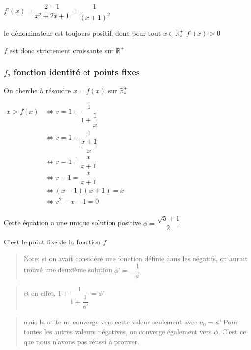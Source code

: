 \documentclass[]{scrartcl}
\begin{document}
\(f’(x) = \dfrac{2-1}{x^2 + 2x + 1} = \dfrac{1}{(x+1)^2}\)

le dénominateur est toujours positif, donc pour tout
\(x \in \mathbb{R}^+_*\) \(f’(x) > 0\)

\(f\) est donc strictement croissante sur \(\mathbb{R}^+\)

\vspace*{2cm}{}

\hypertarget{f-fonction-identituxe9-et-points-fixes}{%
\subsubsection{\texorpdfstring{\(f\), fonction identité et points
fixes}{f, fonction identité et points fixes}}\label{f-fonction-identituxe9-et-points-fixes}}

On cherche à résoudre \(x = f(x)\) sur \(\mathbb{R}^+_*\)

\(\begin{array}{cl} x > f (x) &\iff x = 1 + \dfrac{1}{1 + \dfrac{1}{x}}\\[6ex] &\iff x = 1 + \dfrac{1}{\dfrac{x + 1}{x}}\\[6ex] &\iff x = 1 + \dfrac{x}{x+1}\\[3ex] &\iff x - 1 = \dfrac{x}{x+1}\\[3ex] &\iff (x - 1)(x+1) = x\\[3ex] &\iff x^2 - x - 1 = 0\\ \end{array}\)

Cette équation a une unique solution positive
\(\phi = \dfrac{\sqrt{5}+1}{2}\)

C'est le point fixe de la fonction \(f\)

\begin{quote}
Note: si on avait considéré une fonction définie dans les négatifs, on
aurait trouvé une deuxième solution \(\phi’ = - \dfrac{1}{\phi}\)
\end{quote}

\begin{quote}
et en effet, \(1 + \dfrac{1}{1 + \dfrac{1}{\phi’}} = \phi’\)
\end{quote}

\begin{quote}
mais la suite ne converge vers cette valeur seulement avec
\(u_0 = \phi’\) Pour toutes les autres valeurs négatives, on converge
également vers \(\phi\). C'est ce que nous n'avons pas réussi à prouver.
\end{quote}
\end{document}
